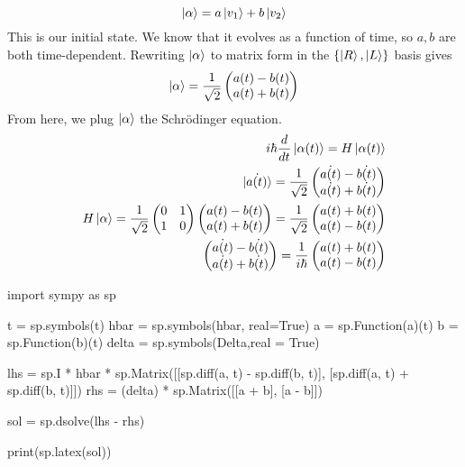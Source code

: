 \documentclass[]{article}
\newenvironment{Shaded}{\begin{snugshade}}{\end{snugshade}}
\newcommand{\NormalTok}[1]{#1}
\begin{document}
\[
\ket{\alpha}  = a\ket{v_{1}} + b\ket{v_{2}}  
\] This is our initial state. We know that it evolves as a function of
time, so \(a,b\) are both time-dependent. Rewriting \(\ket{\alpha}\) to
matrix form in the \(\left\{ \ket{R},\ket{L} \right\}\) basis gives \[
\ket{\alpha} =\frac{1}{\sqrt{ 2 }}\begin{pmatrix}
a(t)-b(t) \\
a(t)+b(t)
\end{pmatrix}
\] From here, we plug \(\ket{\alpha}\) the Schrödinger equation. \[
\begin{align}
i\hbar \frac{d}{dt} \ket{\alpha(t)} =H\ket{\alpha(t)}  \\
\dot{\ket{a(t)}} = \frac{1}{\sqrt{ 2 }}\begin{pmatrix}
\dot{a(t)}-\dot{b(t)} \\
\dot{a(t)}+\dot{b(t)} \\
\end{pmatrix} \\
H\ket{\alpha} = \frac{1}{\sqrt{ 2 }}\begin{pmatrix}
0 & 1 \\
1 & 0
\end{pmatrix}\begin{pmatrix}
a(t)-b(t) \\
a(t)+b(t)
\end{pmatrix}=\frac{1}{\sqrt{ 2 }}\begin{pmatrix}
a(t)+b(t) \\
a(t)-b(t)
\end{pmatrix} \\
\begin{pmatrix}
\dot{a(t)}-\dot{b(t)} \\
\dot{a(t)}+\dot{b(t)} \\
\end{pmatrix} =\frac{1}{i\hbar}\begin{pmatrix}
a(t)+b(t) \\
a(t)-b(t)
\end{pmatrix}
\end{align}
\]

\begin{Shaded}
\begin{Highlighting}[]
\NormalTok{import sympy as sp}

\NormalTok{t = sp.symbols(\textquotesingle{}t\textquotesingle{})}
\NormalTok{hbar = sp.symbols(\textquotesingle{}hbar\textquotesingle{}, real=True)}
\NormalTok{a = sp.Function(\textquotesingle{}a\textquotesingle{})(t)}
\NormalTok{b = sp.Function(\textquotesingle{}b\textquotesingle{})(t)}
\NormalTok{delta = sp.symbols(\textquotesingle{}Delta\textquotesingle{},real = True)}

\NormalTok{lhs = sp.I * hbar * sp.Matrix([[sp.diff(a, t) {-} sp.diff(b, t)], [sp.diff(a, t) + sp.diff(b, t)]])}
\NormalTok{rhs = (delta) * sp.Matrix([[a + b], [a {-} b]])}


\NormalTok{sol = sp.dsolve(lhs {-} rhs)}

\NormalTok{print(sp.latex(sol))}
\end{Highlighting}
\end{Shaded}
\end{document}
